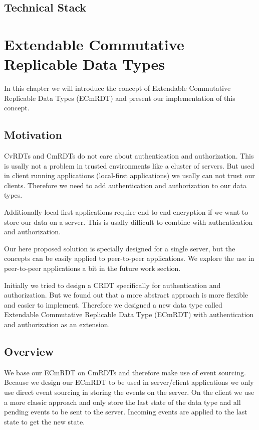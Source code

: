 \documentclass[
	ngerman,
	ruledheaders=section,   %
	class=report,		    %
	thesis={type=bachelor}, %
	accentcolor=9c,			%
	custommargins=false,    %
	marginpar=false,        %
	parskip=half-,          %
	fontsize=11pt,          %
]{tudapub}
\begin{document}
\section{Technical Stack}

\chapter{Extendable Commutative Replicable Data Types}
In this chapter we will introduce the concept of Extendable Commutative Replicable Data Types (ECmRDT) and present our implementation of this concept.

\section{Motivation}
CvRDTs and CmRDTs do not care about authentication and authorization. This is usally not a problem in trusted environments like a cluster of servers. But used in client running applications (local-first applications) we usally can not trust our clients. Therefore we need to add authentication and authorization to our data types. 

Additionally local-first applications require end-to-end encryption if we want to store our data on a server. This is usally difficult to combine with authentication and authorization. 

Our here proposed solution is specially designed for a single server, but the concepts can be easily applied to peer-to-peer applications. We explore the use in peer-to-peer applications a bit in the future work section.

Initially we tried to design a CRDT specifically for authentication and authorization. But we found out that a more abstract approach is more flexible and easier to implement. Therefore we designed a new data type called Extendable Commutative Replicable Data Type (ECmRDT) with authentication and authorization as an extension.

\section{Overview}
We base our ECmRDT on CmRDTs and therefore make use of event sourcing. Because we design our ECmRDT to be used in server/client applications we only use direct event sourcing in storing the events on the server. On the client we use a more classic approach and only store the last state of the data type and all pending events to be sent to the server. Incoming events are applied to the last state to get the new state.
\end{document}
